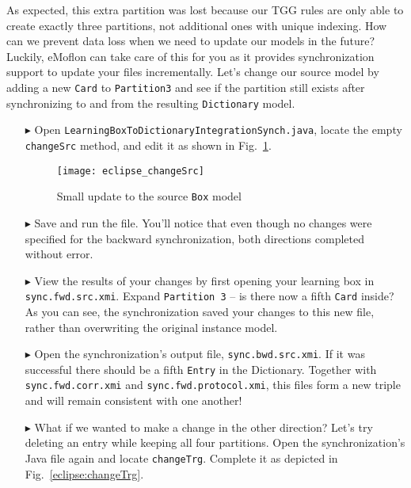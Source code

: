 As expected, this extra partition was lost because our TGG rules are only able to create exactly three partitions, not additional ones with unique indexing.
How can we prevent data loss when we need to update our models in the future? Luckily, eMoflon can take care of this for you as it provides synchronization
support to update your files incrementally. Let's change our source model by adding a new \texttt{Card} to \texttt{Partition3} and see if the partition still
exists after synchronizing to and from the resulting \texttt{Dictionary} model.

\begin{itemize}

\item[$\blacktriangleright$] Open \texttt{LearningBoxToDictionaryIntegrationSynch.java}, locate the empty \texttt{changeSrc} method, and edit it as
shown in Fig.~\ref{eclipse:changeSrc}.

\vspace{0.5cm}

\begin{figure}[htbp]
\begin{center}
  \texttt{[image: eclipse\_changeSrc]}
  \caption{Small update to the source \texttt{Box} model}
  \label{eclipse:changeSrc}
\end{center}
\end{figure}

\item[$\blacktriangleright$] Save and run the file. You'll notice that even though no changes were specified for the backward synchronization, both directions
completed without error.

\item[$\blacktriangleright$] View the results of your changes by first opening your learning box in \texttt{sync.fwd.src.xmi}. Expand \texttt{Partition 3} --
is there now a fifth \texttt{Card} inside? As you can see, the synchronization saved your changes to this new file, rather than overwriting the original
instance model.

\item[$\blacktriangleright$] Open the synchronization's output file, \texttt{sync.bwd.src.xmi}. If it was successful there should be a fifth \texttt{Entry} in
the Dictionary. Together with \texttt{sync.fwd.corr.xmi} and \texttt{sync.fwd.protocol.xmi}, this files form a new triple and will remain consistent with one
another!

\item[$\blacktriangleright$] What if we wanted to make a change in the other direction? Let's try deleting an entry while keeping all four partitions. Open
the synchronization's Java file again and locate \texttt{changeTrg}. Complete it as depicted in Fig.~\ref{eclipse:changeTrg}.


\end{itemize}
